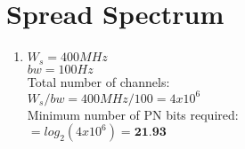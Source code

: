 \documentclass[11pt]{article}
\begin{document}
\section{Spread Spectrum}
\begin{enumerate}[label=(\alph*)]
\item {
	$W_s = 400 MHz$ \\
	$bw = 100 Hz$ \\ 
	
	Total number of channels: \\
	$W_s/bw = 400MHz/100 = 4x10^6$ \\ 
	
	Minimum number of PN bits required: \\ 
	$= log_2(4x10^6) = \textbf{21.93}$
	
}
\end{enumerate}
	
\end{document}
